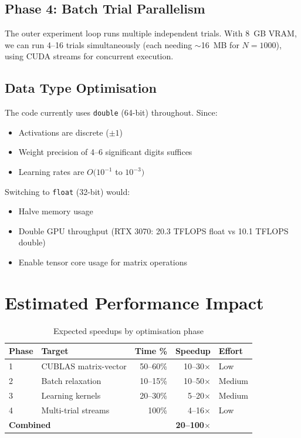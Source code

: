 \documentclass[11pt,a4paper]{article}
\begin{document}
\subsection{Phase 4: Batch Trial Parallelism}

The outer experiment loop runs multiple independent trials. With 8~GB VRAM, we can run 4--16 trials simultaneously (each needing $\sim$16~MB for $N=1000$), using CUDA streams for concurrent execution.

\subsection{Data Type Optimisation}

The code currently uses \texttt{double} (64-bit) throughout. Since:
\begin{itemize}
    \item Activations are discrete ($\pm 1$)
    \item Weight precision of 4--6 significant digits suffices
    \item Learning rates are $O(10^{-1}$ to $10^{-3})$
\end{itemize}

Switching to \texttt{float} (32-bit) would:
\begin{itemize}
    \item Halve memory usage
    \item Double GPU throughput (RTX 3070: 20.3 TFLOPS float vs 10.1 TFLOPS double)
    \item Enable tensor core usage for matrix operations
\end{itemize}

\section{Estimated Performance Impact}

\begin{table}[h]
\centering
\begin{tabular}{llrrl}
\toprule
\textbf{Phase} & \textbf{Target} & \textbf{Time \%} & \textbf{Speedup} & \textbf{Effort} \\
\midrule
1 & CUBLAS matrix-vector & 50--60\% & 10--30$\times$ & Low \\
2 & Batch relaxation & 10--15\% & 10--50$\times$ & Medium \\
3 & Learning kernels & 20--30\% & 5--20$\times$ & Medium \\
4 & Multi-trial streams & 100\% & 4--16$\times$ & Low \\
\midrule
\multicolumn{2}{l}{\textbf{Combined}} & & \textbf{20--100$\times$} & \\
\bottomrule
\end{tabular}
\caption{Expected speedups by optimisation phase}
\end{table}
\end{document}

